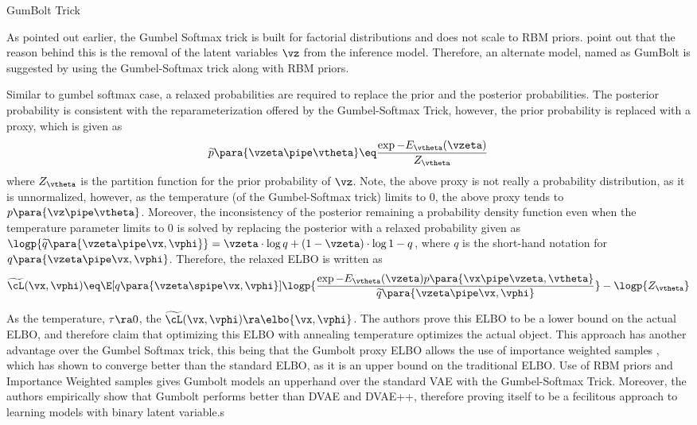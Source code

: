\documentclass{article}
\newcommand{\pp}{p\para}
\newcommand{\qp}{q\para}
\begin{document}
\begin{psection}{GumBolt Trick}

	As pointed out earlier, the Gumbel Softmax trick is built for factorial distributions and does not scale to RBM priors. \cite{gumbolt} point out that the reason behind this is the removal of the latent variables $\vz$ from the inference model. Therefore, an alternate model, named as GumBolt is suggested by \cite{gumbolt} using the Gumbel-Softmax trick along with RBM priors.

	Similar to gumbel softmax case, a relaxed probabilities are required to replace the prior and the posterior probabilities. The posterior probability is consistent with the reparameterization offered by the Gumbel-Softmax Trick, however, the prior probability is replaced with a proxy, which is given as
	\begin{align}
		\widetilde{p}\para{\vzeta \pipe \vtheta} \eq \frac{\exp{-E_\vtheta(\vzeta)}}{Z_\vtheta}
		\label{eq:gumbolt-prob-proxy}
	\end{align}
	where $Z_\vtheta$ is the partition function for the prior probability of $\vz$. Note, the above proxy is not really a probability distribution, as it is unnormalized, however, as the temperature (of the Gumbel-Softmax trick) limits to 0, the above proxy tends to $\pp{\vz \pipe \vtheta}$. Moreover, the inconsistency of the posterior remaining a probability density function even when the temperature parameter limits to 0 is solved by replacing the posterior with a relaxed probability given as $\logp{\widetilde{q}\para{\vzeta \pipe \vx, \vphi}} = \vzeta \cdot \log{q} + (1 - \vzeta) \cdot \log{1 - q}$, where $q$ is the short-hand notation for $\qp{\vzeta \pipe \vx, \vphi}$. Therefore, the relaxed ELBO is written as
	\begin{align}
		\widetilde{\cL}(\vx, \vphi) \eq \E[\qp{\vzeta \spipe \vx, \vphi}]{\logp{\frac{\exp{-E_\vtheta(\vzeta)} \pp{\vx \pipe \vzeta, \vtheta}}{\widetilde{q}\para{\vzeta \pipe \vx, \vphi}}}} - \logp{Z_\vtheta}
		\label{eq:gumbolt-elbo}
	\end{align}

	As the temperature, $\tau \ra 0$, the $\widetilde{\cL}(\vx, \vphi) \ra \elbo{\vx, \vphi}$. The authors prove this ELBO to be a lower bound on the actual ELBO, and therefore claim that optimizing this ELBO with annealing temperature optimizes the actual object. This approach has another advantage over the Gumbel Softmax trick, this being that the Gumbolt proxy ELBO allows the use of importance weighted samples \citep{iwae}, which has shown to converge better than the standard ELBO, as it is an upper bound on the traditional ELBO. Use of RBM priors and Importance Weighted samples gives Gumbolt models an upperhand over the standard VAE with the Gumbel-Softmax Trick. Moreover, the authors empirically show that Gumbolt performs better than DVAE and DVAE++, therefore proving itself to be a fecilitous approach to learning models with binary latent variable.s

\end{psection}
\end{document}
